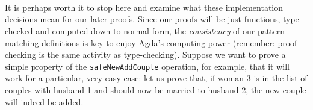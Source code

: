 {\begin{code}
\AgdaSpace{}%
\AgdaSymbol{(}\AgdaSpace{}%
\AgdaOperator{\AgdaInductiveConstructor{,}}\AgdaSpace{}%
\AgdaSymbol{)}\AgdaSpace{}%
\AgdaSpace{}%
\AgdaInductiveConstructor{[]}\<%
\\
\>[0]\AgdaSpace{}%
\AgdaSymbol{(}\AgdaSpace{}%
\AgdaOperator{\AgdaInductiveConstructor{,}}\AgdaSpace{}%
\AgdaSymbol{)}\AgdaSpace{}%
\AgdaSymbol{((}\AgdaSpace{}%
\AgdaOperator{\AgdaInductiveConstructor{,}}\AgdaSpace{}%
\AgdaSymbol{)}\AgdaSpace{}%
\AgdaSpace{}%
\AgdaSymbol{(}\AgdaSpace{}%
\AgdaSpace{}%
\AgdaSymbol{))}\AgdaSpace{}%
\AgdaSpace{}%
\AgdaSpace{}%
\AgdaSpace{}%
\<%
\\
\>[0]\AgdaSpace{}%
\AgdaSymbol{|}\AgdaSpace{}%
\AgdaSpace{}%
\AgdaSymbol{\AgdaUnderscore{}}\AgdaSpace{}%
\AgdaSymbol{=}\AgdaSpace{}%
\AgdaSymbol{(}\AgdaSpace{}%
\AgdaOperator{\AgdaInductiveConstructor{,}}\AgdaSpace{}%
\AgdaSymbol{)}\AgdaSpace{}%
\AgdaSpace{}%
\AgdaSpace{}%
\AgdaSpace{}%
\<%
\\
\>[0]\AgdaSpace{}%
\AgdaSymbol{|}\AgdaSpace{}%
\AgdaSymbol{\AgdaUnderscore{}}%
\>[14]\AgdaSymbol{=}\AgdaSpace{}%
\AgdaSymbol{(}\AgdaSpace{}%
\AgdaOperator{\AgdaInductiveConstructor{,}}\AgdaSpace{}%
\AgdaSymbol{)}\AgdaSpace{}%
\AgdaSpace{}%
\AgdaSpace{}%
\AgdaSymbol{(}\AgdaSpace{}%
\AgdaOperator{\AgdaInductiveConstructor{,}}\AgdaSpace{}%
\AgdaSymbol{)}\AgdaSpace{}%
\AgdaSymbol{(}\AgdaSpace{}%
\AgdaSpace{}%
\AgdaSymbol{)}\<%
\end{code}

It is perhaps worth it to stop here and examine what these implementation decisions mean for our later proofs. Since our proofs will be just functions, type-checked and computed down to normal form, the \emph{consistency} of our pattern matching definitions is key to enjoy Agda's computing power (remember: proof-checking is the same activity as type-checking). Suppose we want to prove a simple property of the \texttt{safeNewAddCouple} operation, for example, that it will work for a particular, very easy case: let us prove that, if woman 3 is in the list of couples with husband 1 and should now be married to husband 2, the new couple will indeed be added.

}
